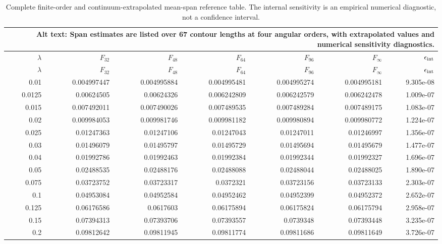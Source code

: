 \begingroup
\scriptsize
\setlength{\tabcolsep}{2.0pt}
\renewcommand{\arraystretch}{0.96}
\setlength{\LTleft}{\fill}
\setlength{\LTright}{\fill}
\begin{longtable}{@{}rrrrrrr@{}}
\caption{Complete finite-order and continuum-extrapolated mean-span reference table.  The internal sensitivity is an empirical numerical diagnostic, not a confidence interval.}\label{tab:complete_reference}\\
\multicolumn{7}{p{0.90\linewidth}}{\textbf{Alt text:} Span estimates are listed over 67 contour lengths at four angular orders, with extrapolated values and numerical sensitivity diagnostics.}\\
\toprule
{$\lambda$}&{$F_{32}$}&{$F_{48}$}&{$F_{64}$}&{$F_{96}$}&{$F_\infty$}&{$\epsilon_{\rm int}$}\\
\midrule
\endfirsthead
\toprule
{$\lambda$}&{$F_{32}$}&{$F_{48}$}&{$F_{64}$}&{$F_{96}$}&{$F_\infty$}&{$\epsilon_{\rm int}$}\\
\midrule
\endhead
0.01 & 0.004997447 & 0.004995884 & 0.004995481 & 0.004995274 & 0.004995181 & 9.305e-08\\
0.0125 & 0.00624505 & 0.00624326 & 0.006242809 & 0.006242579 & 0.006242478 & 1.009e-07\\
0.015 & 0.007492011 & 0.007490026 & 0.007489535 & 0.007489284 & 0.007489175 & 1.083e-07\\
0.02 & 0.009984053 & 0.009981746 & 0.009981182 & 0.009980894 & 0.009980772 & 1.224e-07\\
0.025 & 0.01247363 & 0.01247106 & 0.01247043 & 0.01247011 & 0.01246997 & 1.356e-07\\
0.03 & 0.01496079 & 0.01495797 & 0.01495729 & 0.01495694 & 0.01495679 & 1.477e-07\\
0.04 & 0.01992786 & 0.01992463 & 0.01992384 & 0.01992344 & 0.01992327 & 1.696e-07\\
0.05 & 0.02488535 & 0.02488176 & 0.02488088 & 0.02488044 & 0.02488025 & 1.890e-07\\
0.075 & 0.03723752 & 0.03723317 & 0.0372321 & 0.03723156 & 0.03723133 & 2.303e-07\\
0.1 & 0.04953084 & 0.04952584 & 0.04952462 & 0.04952399 & 0.04952372 & 2.652e-07\\
0.125 & 0.06176586 & 0.0617603 & 0.06175894 & 0.06175824 & 0.06175794 & 2.958e-07\\
0.15 & 0.07394313 & 0.07393706 & 0.07393557 & 0.0739348 & 0.07393448 & 3.235e-07\\
0.2 & 0.09812642 & 0.09811945 & 0.09811774 & 0.09811686 & 0.09811649 & 3.726e-07\\

\end{longtable}
